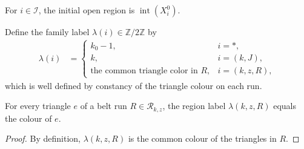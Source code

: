 \begin{definition}
    \label{def:area_law_initial_open_regions}
    \leanok
    For $i\in\mathcal I$, the initial open region is
    $\operatorname{int}(X_i^0)$.
\end{definition}

\begin{definition}
    \label{def:area_law_initial_region_colors}
    \leanok
    Define the family label $\lambda(i)\in\mathbb Z/2\mathbb Z$ by
    \begin{align}
        \lambda(i) & =
        \begin{cases}
            k_0-1,                                 & i=*,       \\
            k,                                     & i=(k,J),   \\
            \text{the common triangle color in }R, & i=(k,z,R),
        \end{cases}
    \end{align}
    which is well defined by constancy of the triangle colour on each run.
\end{definition}

\begin{lemma}
    \label{thm:area_law_initial_run_color}
    \leanok
    For every triangle $e$ of a belt run $R\in\mathcal R_{k,z}$, the region
    label $\lambda(k,z,R)$ equals the colour of $e$.
\end{lemma}
\begin{proof}\leanok
    By definition, $\lambda(k,z,R)$ is the common colour of the triangles
    in $R$.
\end{proof}

